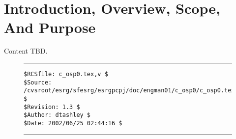 %
\chapter{Introduction, Overview, Scope, And Purpose}
\label{cosp0}

Content TBD.


\noindent\begin{figure}[!b]
\noindent\rule[-0.25in]{\textwidth}{1pt}
\begin{tiny}
\begin{verbatim}
$RCSfile: c_osp0.tex,v $
$Source: /cvsroot/esrg/sfesrg/esrgpcpj/doc/engman01/c_osp0/c_osp0.tex,v $
$Revision: 1.3 $
$Author: dtashley $
$Date: 2002/06/25 02:44:16 $
\end{verbatim}
\end{tiny}
\noindent\rule[0.25in]{\textwidth}{1pt}
\end{figure}
%
%
%
